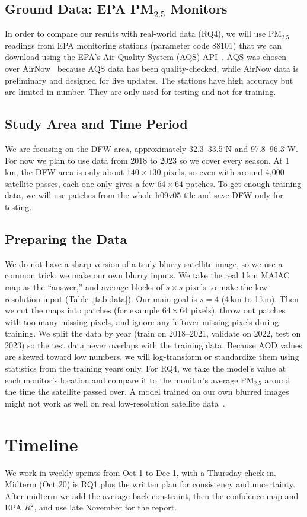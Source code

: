\documentclass[conference]{IEEEtran}
\begin{document}
\subsection{Ground Data: EPA PM$_{2.5}$ Monitors}
In order to compare our results with real-world data (RQ4), we will use PM$_{2.5}$ readings from EPA monitoring stations (parameter code 88101) that we can download using the EPA's Air Quality System (AQS) API~\cite{epa_aqs}. AQS was chosen over AirNow~\cite{epa_airnow} because AQS data has been quality-checked, while AirNow data is preliminary and designed for live updates. The stations have high accuracy but are limited in number. They are only used for testing and not for training.
\subsection{Study Area and Time Period}
We are focusing on the DFW area, approximately 32.3--33.5$^\circ$N and 97.8--96.3$^\circ$W. For now we plan to use data from 2018 to 2023 so we cover every season. At 1\,km, the DFW area is only about $140\times130$ pixels, so even with around 4{,}000 satellite passes, each one only gives a few $64\times64$ patches. To get enough training data, we will use patches from the whole h09v05 tile and save DFW only for testing.
\subsection{Preparing the Data}
We do not have a sharp version of a truly blurry satellite image, so we use a common trick: we make our own blurry inputs. We take the real 1\,km MAIAC map as the ``answer,'' and average blocks of $s\times s$ pixels to make the low-resolution input (Table~\ref{tab:data}). Our main goal is $s{=}4$ (4\,km to 1\,km). Then we cut the maps into patches (for example $64\times64$ pixels), throw out patches with too many missing pixels, and ignore any leftover missing pixels during training. We split the data by year (train on 2018--2021, validate on 2022, test on 2023) so the test data never overlaps with the training data. Because AOD values are skewed toward low numbers, we will log-transform or standardize them using statistics from the training years only. For RQ4, we take the model's value at each monitor's location and compare it to the monitor's average PM$_{2.5}$ around the time the satellite passed over. A model trained on our own blurred images might not work as well on real low-resolution satellite data~\cite{aybar2026sen2sr}.
\section{Timeline}
We work in weekly sprints from Oct 1 to Dec 1, with a Thursday check-in. Midterm (Oct 20) is RQ1 plus the written plan for consistency and uncertainty. After midterm we add the average-back constraint, then the confidence map and EPA $R^2$, and use late November for the report.
\clearpage


\end{document}
